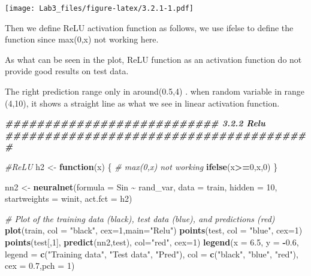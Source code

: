 \documentclass[
]{article}
\newenvironment{Shaded}{\begin{snugshade}}{\end{snugshade}}
\newcommand{\AttributeTok}[1]{\textcolor[rgb]{0.13,0.29,0.53}{#1}}
\newcommand{\CommentTok}[1]{\textcolor[rgb]{0.56,0.35,0.01}{\textit{#1}}}
\newcommand{\ControlFlowTok}[1]{\textcolor[rgb]{0.13,0.29,0.53}{\textbf{#1}}}
\newcommand{\DecValTok}[1]{\textcolor[rgb]{0.00,0.00,0.81}{#1}}
\newcommand{\DocumentationTok}[1]{\textcolor[rgb]{0.56,0.35,0.01}{\textbf{\textit{#1}}}}
\newcommand{\FloatTok}[1]{\textcolor[rgb]{0.00,0.00,0.81}{#1}}
\newcommand{\FunctionTok}[1]{\textcolor[rgb]{0.13,0.29,0.53}{\textbf{#1}}}
\newcommand{\NormalTok}[1]{#1}
\newcommand{\OtherTok}[1]{\textcolor[rgb]{0.56,0.35,0.01}{#1}}
\newcommand{\SpecialCharTok}[1]{\textcolor[rgb]{0.81,0.36,0.00}{\textbf{#1}}}
\newcommand{\StringTok}[1]{\textcolor[rgb]{0.31,0.60,0.02}{#1}}
\begin{document}
\texttt{[image: Lab3\_files/figure-latex/3.2.1-1.pdf]}

Then we define ReLU activation function as follows, we use ifelse to
define the function since max(0,x) not working here.

As what can be seen in the plot, ReLU function as an activation function
do not provide good results on test data.

The right prediction range only in around(0.5,4) . when random variable
in range (4,10), it shows a straight line as what we see in linear
activation function.

\begin{Shaded}
\begin{Highlighting}[]
\DocumentationTok{\#\#\#\#\#\#\#\#\#\#\#\#\#\#\#\#\#\#\#\#\#\#\#\#\#\#\#  3.2.2 Relu \#\#\#\#\#\#\#\#\#\#\#\#\#\#\#\#\#\#\#\#\#\#\#\#\#\#\#\#\#\#\#\#\#\#\#\#\#\#\#}

\CommentTok{\#ReLU}
\NormalTok{h2 }\OtherTok{\textless{}{-}} \ControlFlowTok{function}\NormalTok{(x) \{}
  \CommentTok{\# max(0,x) not working}
  \FunctionTok{ifelse}\NormalTok{(x}\SpecialCharTok{\textgreater{}=}\DecValTok{0}\NormalTok{,x,}\DecValTok{0}\NormalTok{)}
\NormalTok{\}}


\NormalTok{nn2 }\OtherTok{\textless{}{-}} \FunctionTok{neuralnet}\NormalTok{(}\AttributeTok{formula =}\NormalTok{ Sin }\SpecialCharTok{\textasciitilde{}}\NormalTok{ rand\_var, }\AttributeTok{data =}\NormalTok{ train, }\AttributeTok{hidden =} \DecValTok{10}\NormalTok{,}
\AttributeTok{startweights =}\NormalTok{ winit, }\AttributeTok{act.fct =}\NormalTok{ h2)}

\CommentTok{\# Plot of the training data (black), test data (blue), and predictions (red)}
\FunctionTok{plot}\NormalTok{(train,  }\AttributeTok{col =} \StringTok{"black"}\NormalTok{, }\AttributeTok{cex=}\DecValTok{1}\NormalTok{,}\AttributeTok{main=}\StringTok{"Relu"}\NormalTok{)}
\FunctionTok{points}\NormalTok{(test, }\AttributeTok{col =} \StringTok{"blue"}\NormalTok{, }\AttributeTok{cex=}\DecValTok{1}\NormalTok{)}
\FunctionTok{points}\NormalTok{(test[,}\DecValTok{1}\NormalTok{], }\FunctionTok{predict}\NormalTok{(nn2,test), }\AttributeTok{col=}\StringTok{"red"}\NormalTok{, }\AttributeTok{cex=}\DecValTok{1}\NormalTok{)}
\FunctionTok{legend}\NormalTok{(}\AttributeTok{x =} \FloatTok{6.5}\NormalTok{, }\AttributeTok{y =} \SpecialCharTok{{-}}\FloatTok{0.6}\NormalTok{, }\AttributeTok{legend =} \FunctionTok{c}\NormalTok{(}\StringTok{"Training data"}\NormalTok{, }\StringTok{"Test data"}\NormalTok{,}
\StringTok{"Pred"}\NormalTok{), }\AttributeTok{col =} \FunctionTok{c}\NormalTok{(}\StringTok{"black"}\NormalTok{, }\StringTok{"blue"}\NormalTok{, }\StringTok{"red"}\NormalTok{), }\AttributeTok{cex =} \FloatTok{0.7}\NormalTok{,}\AttributeTok{pch =} \DecValTok{1}\NormalTok{)}
\end{Highlighting}
\end{Shaded}
\end{document}
